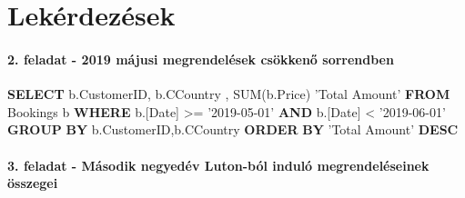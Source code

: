 \documentclass[
]{article}
\newenvironment{Shaded}{\begin{snugshade}}{\end{snugshade}}
\newcommand{\DataTypeTok}[1]{\textcolor[rgb]{0.56,0.13,0.00}{#1}}
\newcommand{\FunctionTok}[1]{\textcolor[rgb]{0.02,0.16,0.49}{#1}}
\newcommand{\KeywordTok}[1]{\textcolor[rgb]{0.00,0.44,0.13}{\textbf{#1}}}
\newcommand{\NormalTok}[1]{#1}
\newcommand{\OperatorTok}[1]{\textcolor[rgb]{0.40,0.40,0.40}{#1}}
\newcommand{\StringTok}[1]{\textcolor[rgb]{0.25,0.44,0.63}{#1}}
\begin{document}
\hypertarget{lekuxe9rdezuxe9sek}{%
\section{Lekérdezések}\label{lekuxe9rdezuxe9sek}}

\hypertarget{feladat---2019-muxe1jusi-megrendeluxe9sek-csuxf6kkenux151-sorrendben}{%
\paragraph{2. feladat - 2019 májusi megrendelések csökkenő
sorrendben}\label{feladat---2019-muxe1jusi-megrendeluxe9sek-csuxf6kkenux151-sorrendben}}

\begin{Shaded}
\begin{Highlighting}[]
\KeywordTok{SELECT}\NormalTok{ b.CustomerID, b.CCountry , }\FunctionTok{SUM}\NormalTok{(b.Price) }\StringTok{'Total Amount'}
\KeywordTok{FROM}\NormalTok{ Bookings b}
\KeywordTok{WHERE}\NormalTok{ b.[}\DataTypeTok{Date}\NormalTok{] }\OperatorTok{>=} \StringTok{'2019-05-01'} \KeywordTok{AND}\NormalTok{ b.[}\DataTypeTok{Date}\NormalTok{] }\OperatorTok{<} \StringTok{'2019-06-01'}
\KeywordTok{GROUP} \KeywordTok{BY}\NormalTok{ b.CustomerID,b.CCountry}
\KeywordTok{ORDER} \KeywordTok{BY} \StringTok{'Total Amount'} \KeywordTok{DESC}
\end{Highlighting}
\end{Shaded}

\hypertarget{feladat---muxe1sodik-negyeduxe9v-luton-buxf3l-induluxf3-megrendeluxe9seinek-uxf6sszegei}{%
\paragraph{3. feladat - Második negyedév Luton-ból induló
megrendeléseinek
összegei}\label{feladat---muxe1sodik-negyeduxe9v-luton-buxf3l-induluxf3-megrendeluxe9seinek-uxf6sszegei}}
\end{document}
